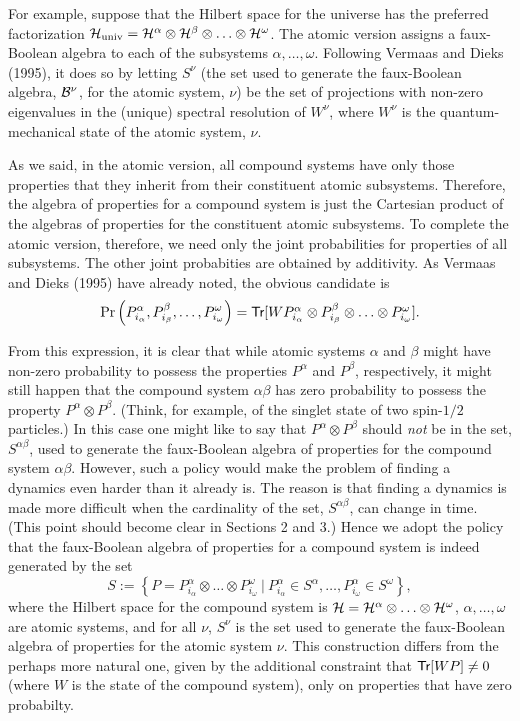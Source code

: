 \documentclass[12pt]{article}
\newcommand{\be}{\begin{equation}}
\newcommand{\ee}{\end{equation}}
\newcommand{\cH}{\cal{H}}                                       %
\newcommand{\cB}{\cal{B}}                                       %
\newcommand{\ga}{\alpha}                                        %
\newcommand{\gb}{\beta}                                         %
\newcommand{\gab}{\alpha\beta}                                  %
\newcommand{\gn}{\nu}                                           %
\newcommand{\gw}{\omega}                                        %
\newcommand{\Tr}[1]{\mbox{{\sf Tr}$[#1]$}}                      %
\begin{document}
For example, suppose that the Hilbert space for the universe has the
preferred factorization $\cH_{\mbox{{\scriptsize univ}}} = \cH^{\ga}
\otimes \cH^{\gb} \otimes \ldots \otimes \cH^{\gw}$. The atomic version
assigns a faux-Boolean algebra to each of the subsystems $\ga , \ldots 
, \gw$.  Following Vermaas and Dieks (1995), it does so by letting 
$S^{\gn}$ (the set used to generate the faux-Boolean algebra, 
${\cB}^{\gn}$, for the atomic system, $\gn$) be the set of projections 
with non-zero eigenvalues in the (unique) spectral resolution of 
$W^{\gn}$, where $W^{\gn}$ is the quantum-mechanical state of the 
atomic system, $\gn$.

As we said, in the atomic version, all compound systems have only
those properties that they inherit from their constituent atomic
subsystems.  Therefore, the algebra of properties for a compound
system is just the Cartesian product of the algebras of properties for
the constituent atomic subsystems.  To complete the atomic version,
therefore, we need only the joint probabilities for properties of all
subsystems.  The other joint probabities are obtained by additivity.  As
Vermaas and Dieks (1995) have already noted, the obvious candidate is
\be
\Pr \left( { P^{\ga}_{i_\ga}, P^{\gb}_{i_\gb}, \ldots , P^{\gw}_{i_\gw}}
\right) =
\Tr{WP^{\ga}_{i_\ga} \otimes P^{\gb}_{i_\gb} \otimes \ldots \otimes
P^{\gw}_{i_\gw}}.
\ee

From this expression, it is clear that while atomic systems $\ga$ and
$\gb$ might have non-zero probability to possess the properties
$P^{\ga}$ and $P^{\gb}$, respectively, it might still happen that the
compound system $\gab$ has zero probability to possess the property
$P^{\ga}\otimes P^{\gb}$.  (Think, for example, of the singlet state
of two spin-$1/2$ particles.) In this case one might like to say that
$P^{\ga}\otimes P^{\gb}$ should {\it not} be in the set, $S^{\gab}$,
used to generate the faux-Boolean algebra of properties for the
compound system $\gab$.  However, such a policy would make the problem
of finding a dynamics even harder than it already is.  The reason is
that finding a dynamics is made more difficult when the cardinality of
the set, $S^{\gab}$, can change in time.  (This point should become
clear in Sections 2 and 3.) Hence we adopt the policy that the
faux-Boolean algebra of properties for a compound system is indeed
generated by the set
\be
\label{eq:composite}
S := \left\{ { P = P^{\ga}_{i_{\ga}} \otimes \ldots \otimes
P^{\gw}_{i_{\gw}}\ |\ P^{\ga}_{i_{\ga}} \in S^{\ga}, \ldots ,
P^{\ga}_{i_{\gw}} \in S^{\gw} } \right\},
\ee
where the Hilbert space for the compound system is $\cH = \cH^{\ga}
\otimes \ldots \otimes \cH^{\gw}$, $\ga, \ldots , \gw$ are atomic systems,
and for all $\gn$, $S^{\gn}$ is the set used to generate the faux-Boolean
algebra of properties for the atomic system $\gn$.  This construction
differs from the perhaps more natural one, given by the additional
constraint that $\Tr{WP} \neq 0$ (where $W$ is the state of the
compound system), only on properties that have zero probabilty.
\end{document}
